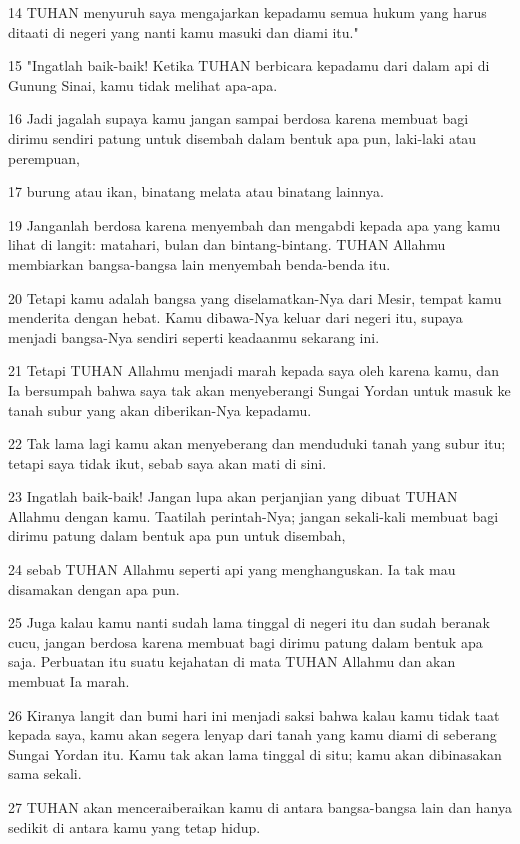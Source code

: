 \par 14 TUHAN menyuruh saya mengajarkan kepadamu semua hukum yang harus ditaati di negeri yang nanti kamu masuki dan diami itu."
\par 15 "Ingatlah baik-baik! Ketika TUHAN berbicara kepadamu dari dalam api di Gunung Sinai, kamu tidak melihat apa-apa.
\par 16 Jadi jagalah supaya kamu jangan sampai berdosa karena membuat bagi dirimu sendiri patung untuk disembah dalam bentuk apa pun, laki-laki atau perempuan,
\par 17 burung atau ikan, binatang melata atau binatang lainnya.
\par 19 Janganlah berdosa karena menyembah dan mengabdi kepada apa yang kamu lihat di langit: matahari, bulan dan bintang-bintang. TUHAN Allahmu membiarkan bangsa-bangsa lain menyembah benda-benda itu.
\par 20 Tetapi kamu adalah bangsa yang diselamatkan-Nya dari Mesir, tempat kamu menderita dengan hebat. Kamu dibawa-Nya keluar dari negeri itu, supaya menjadi bangsa-Nya sendiri seperti keadaanmu sekarang ini.
\par 21 Tetapi TUHAN Allahmu menjadi marah kepada saya oleh karena kamu, dan Ia bersumpah bahwa saya tak akan menyeberangi Sungai Yordan untuk masuk ke tanah subur yang akan diberikan-Nya kepadamu.
\par 22 Tak lama lagi kamu akan menyeberang dan menduduki tanah yang subur itu; tetapi saya tidak ikut, sebab saya akan mati di sini.
\par 23 Ingatlah baik-baik! Jangan lupa akan perjanjian yang dibuat TUHAN Allahmu dengan kamu. Taatilah perintah-Nya; jangan sekali-kali membuat bagi dirimu patung dalam bentuk apa pun untuk disembah,
\par 24 sebab TUHAN Allahmu seperti api yang menghanguskan. Ia tak mau disamakan dengan apa pun.
\par 25 Juga kalau kamu nanti sudah lama tinggal di negeri itu dan sudah beranak cucu, jangan berdosa karena membuat bagi dirimu patung dalam bentuk apa saja. Perbuatan itu suatu kejahatan di mata TUHAN Allahmu dan akan membuat Ia marah.
\par 26 Kiranya langit dan bumi hari ini menjadi saksi bahwa kalau kamu tidak taat kepada saya, kamu akan segera lenyap dari tanah yang kamu diami di seberang Sungai Yordan itu. Kamu tak akan lama tinggal di situ; kamu akan dibinasakan sama sekali.
\par 27 TUHAN akan menceraiberaikan kamu di antara bangsa-bangsa lain dan hanya sedikit di antara kamu yang tetap hidup.
